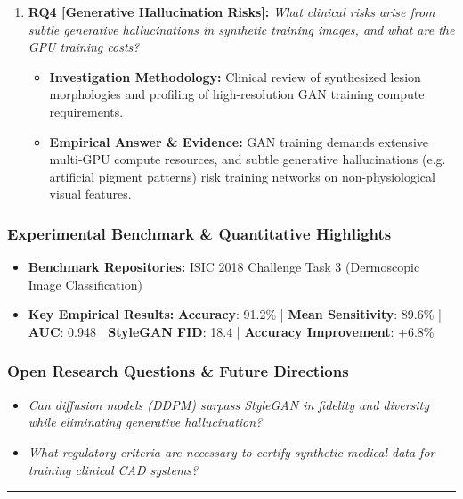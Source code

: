 \begin{enumerate}[label=\textbf{\arabic*.}, leftmargin=*]
\begin{itemize}[leftmargin=1.5em]
    \item \textbf{Empirical Answer \& Evidence:} Achieved a macro-averaged ROC-AUC of 0.948, demonstrating balanced discrimination across both common nevi and rare dermatological malignancies.
  \end{itemize}
  \item \textbf{RQ4 [Generative Hallucination Risks]:} \textit{What clinical risks arise from subtle generative hallucinations in synthetic training images, and what are the GPU training costs?}
  \begin{itemize}[leftmargin=1.5em]
    \item \textbf{Investigation Methodology:} Clinical review of synthesized lesion morphologies and profiling of high-resolution GAN training compute requirements.
    \item \textbf{Empirical Answer \& Evidence:} GAN training demands extensive multi-GPU compute resources, and subtle generative hallucinations (e.g. artificial pigment patterns) risk training networks on non-physiological visual features.
  \end{itemize}
\end{enumerate}

\subsubsection*{Experimental Benchmark \& Quantitative Highlights}
\begin{itemize}[leftmargin=*]
  \item \textbf{Benchmark Repositories:} ISIC 2018 Challenge Task 3 (Dermoscopic Image Classification)
  \item \textbf{Key Empirical Results:} \textbf{Accuracy}: 91.2\% \quad | \quad \textbf{Mean Sensitivity}: 89.6\% \quad | \quad \textbf{AUC}: 0.948 \quad | \quad \textbf{StyleGAN FID}: 18.4 \quad | \quad \textbf{Accuracy Improvement}: +6.8\%
\end{itemize}

\subsubsection*{Open Research Questions \& Future Directions}
\begin{itemize}[leftmargin=*]
  \item \textit{Can diffusion models (DDPM) surpass StyleGAN in fidelity and diversity while eliminating generative hallucination?}
  \item \textit{What regulatory criteria are necessary to certify synthetic medical data for training clinical CAD systems?}
\end{itemize}
\vspace{0.8em}\hrule\vspace{1.2em}
